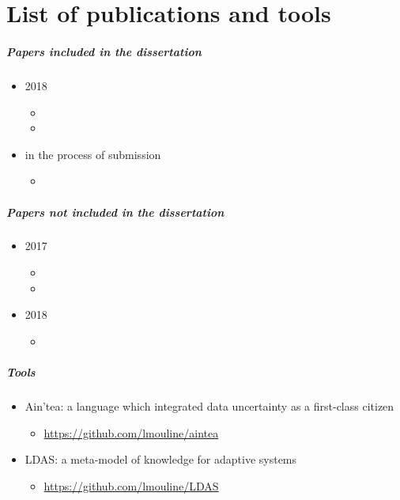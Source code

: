 \chapter*{List of publications and tools}

\paragraph{Papers included in the dissertation}

\begin{itemize}
	\item 2018
	\begin{itemize}
		\item {}
		\item {}
	\end{itemize}
	\item in the process of submission
	\begin{itemize}
		\item {}
	\end{itemize}
\end{itemize}

\paragraph{Papers not included in the dissertation}

\begin{itemize}
	\item 2017
	\begin{itemize}
		\item {}
		\item {}
	\end{itemize}
	\item 2018
	\begin{itemize}
		\item {}
	\end{itemize}
\end{itemize}

\paragraph{Tools}

\begin{itemize}
	\item Ain'tea: a language which integrated data uncertainty as a first-class citizen
	\begin{itemize}
		\item \url{https://github.com/lmouline/aintea}
	\end{itemize}
	\item LDAS: a meta-model of knowledge for adaptive systems
	\begin{itemize}
		\item \url{https://github.com/lmouline/LDAS}
	\end{itemize}
\end{itemize}